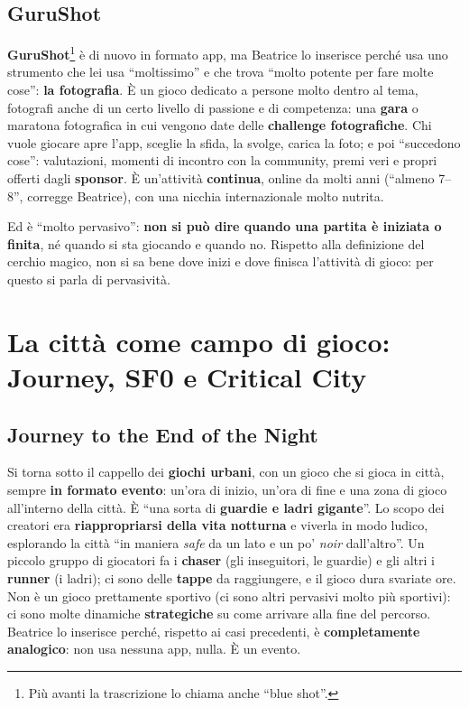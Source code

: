 \subsection{GuruShot}

\textbf{GuruShot}\footnote{Più avanti la trascrizione lo chiama anche ``blue
shot''.} è di nuovo in formato app, ma Beatrice lo inserisce perché usa uno
strumento che lei usa ``moltissimo'' e che trova ``molto potente per fare molte
cose'': \textbf{la fotografia}. È un gioco dedicato a persone molto dentro al
tema, fotografi anche di un certo livello di passione e di competenza: una
\textbf{gara} o maratona fotografica in cui vengono date delle \textbf{challenge
fotografiche}. Chi vuole giocare apre l'app, sceglie la sfida, la svolge, carica
la foto; e poi ``succedono cose'': valutazioni, momenti di incontro con la
community, premi veri e propri offerti dagli \textbf{sponsor}. È un'attività
\textbf{continua}, online da molti anni (``almeno 7--8'', corregge Beatrice), con
una nicchia internazionale molto nutrita.

Ed è ``molto pervasivo'': \textbf{non si può dire quando una partita è iniziata
o finita}, né quando si sta giocando e quando no. Rispetto alla definizione del
cerchio magico, non si sa bene dove inizi e dove finisca l'attività di gioco:
per questo si parla di pervasività.

\section{La città come campo di gioco: Journey, SF0 e Critical City}
\label{a2:sec:pervasivi-citta}

\subsection{Journey to the End of the Night}



Si torna sotto il cappello dei \textbf{giochi urbani}, con un gioco che si
gioca in città, sempre \textbf{in formato evento}: un'ora di inizio, un'ora di
fine e una zona di gioco all'interno della città. È ``una sorta di \textbf{guardie
e ladri gigante}''. Lo scopo dei creatori era \textbf{riappropriarsi della vita
notturna} e viverla in modo ludico, esplorando la città ``in maniera
\emph{safe} da un lato e un po' \emph{noir} dall'altro''. Un piccolo gruppo di
giocatori fa i \textbf{chaser} (gli inseguitori, le guardie) e gli altri i
\textbf{runner} (i ladri); ci sono delle \textbf{tappe} da raggiungere, e il
gioco dura svariate ore. Non è un gioco prettamente sportivo (ci sono altri
pervasivi molto più sportivi): ci sono molte dinamiche \textbf{strategiche} su
come arrivare alla fine del percorso. Beatrice lo inserisce perché, rispetto ai
casi precedenti, è \textbf{completamente analogico}: non usa nessuna app, nulla.
È un evento.

